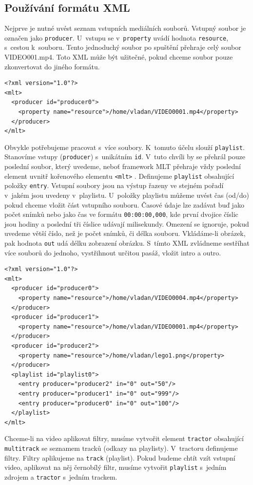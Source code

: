 \subsection{Používání formátu XML}
Nejprve je nutné uvést seznam vstupních mediálních souborů. Vstupný soubor je označen jako \texttt{producer}. U~vstupu se v~\texttt{property} uvádí hodnota \texttt{resource}, s~cestou k~souboru. Tento jednoduchý soubor po spuštění přehraje celý soubor VIDEO001.mp4. Toto XML může být užitečné, pokud chceme soubor pouze zkonvertovat do jiného formátu.
\begin{lstlisting}[style=xml]
<?xml version="1.0"?>
<mlt>
  <producer id="producer0">
    <property name="resource">/home/vladan/VIDEO0001.mp4</property>
  </producer>
</mlt>
\end{lstlisting}
Obvykle potřebujeme pracovat s~více soubory. K~tomuto účelu slouží \texttt{playlist}. Stanovíme vstupy (\texttt{producer}) s~unikátním \texttt{id}. V~tuto chvíli by se přehrál pouze poslední soubor, který uvedeme, neboť framework MLT přehraje vždy poslední element uvnitř kořenového elementu \texttt{<mlt>} . Definujeme \texttt{playlist} obsahující položky \texttt{entry}. Vstupní soubory jsou na výstup řazeny ve stejném pořadí v~jakém jsou uvedeny v~playlistu. U~položky playlistu můžeme uvést čas (od/do) pokud chceme vložit část vstupního souboru. Časové údaje lze zadávat buď jako počet snímků nebo jako čas ve formátu \texttt{00:00:00,000}, kde první dvojice číslic jsou hodiny a poslední tři číslice udávají milisekundy. Omezení se ignoruje, pokud uvedeme větší číslo, než je počet snímků, či délka souboru. Vkládáme-li obrázek, pak hodnota \texttt{out} udá délku zobrazení obrázku. S~tímto XML zvládneme sestříhat více souborů do jednoho, vystřihnout určitou pasáž, vložit intro a outro.
\begin{lstlisting}[style=xml]
<?xml version="1.0"?>
<mlt>
  <producer id="producer0">
    <property name="resource">/home/vladan/VIDEO0004.mp4</property>
  </producer>
  <producer id="producer1">
    <property name="resource">/home/vladan/VIDEO0001.mp4</property>
  </producer>
  <producer id="producer2">
    <property name="resource">/home/vladan/lego1.png</property>
  </producer>
  <playlist id="playlist0">
    <entry producer="producer2" in="0" out="50"/>
    <entry producer="producer1" in="0" out="999"/>
    <entry producer="producer0" in="0" out="100"/>
  </playlist>
</mlt>
\end{lstlisting}
Chceme-li na video aplikovat filtry, musíme vytvořit element \texttt{tractor} obsahující \texttt{multitrack} se seznamem tracků (odkazy na playlisty). V~tractoru definujeme filtry. Filtry aplikujeme na \texttt{track} (playlist). Pokud budeme chtít vzít vstupní video, aplikovat na něj černobílý filtr, musíme vytvořit \texttt{playlist} s~jedním zdrojem a \texttt{tractor} s~jedním trackem.
